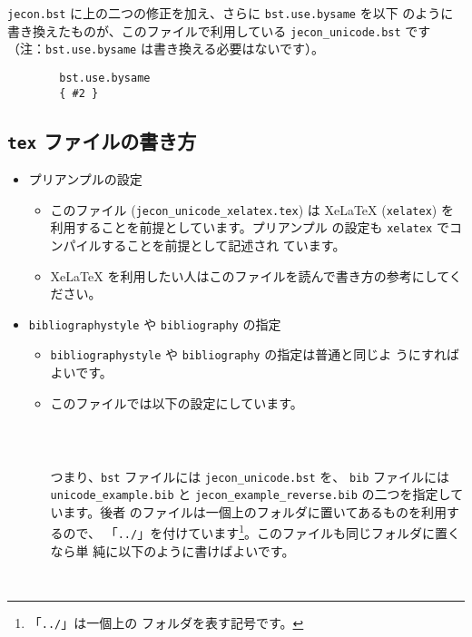 \documentclass[a4paper,10pt]{bxjsarticle}
\begin{document}
\texttt{jecon.bst} に上の二つの修正を加え、さらに \texttt{bst.use.bysame} を以下
のように書き換えたものが、このファイルで利用している \texttt{jecon\_unicode.bst}
です（注：\texttt{bst.use.bysame} は書き換える必要はないです）。
\begin{verbatim}
        bst.use.bysame
        { #2 }
\end{verbatim}

\subsection{\texttt{tex} ファイルの書き方}

\begin{itemize}
 \item プリアンプルの設定
       \begin{itemize}
        \item このファイル (\texttt{jecon\_unicode\_xelatex.tex}) は XeLaTeX
              (\texttt{xelatex}) を利用することを前提としています。プリアンプル
              の設定も \texttt{xelatex} でコンパイルすることを前提として記述され
              ています。
        \item XeLaTeX を利用したい人はこのファイルを読んで書き方の参考にしてく
              ださい。
       \end{itemize}
 \item \texttt{bibliographystyle} や \texttt{bibliography} の指定
       \begin{itemize}
        \item \texttt{bibliographystyle} や \texttt{bibliography} の指定は普通と同じよ
       うにすればよいです。
        \item このファイルでは以下の設定にしています。
\begin{verbatim}
           
            
\end{verbatim}
       つまり、\texttt{bst} ファイルには \texttt{jecon\_unicode.bst} を、
              \texttt{bib} ファイルには \texttt{unicode\_example.bib} と
              \texttt{jecon\_example\_reverse.bib} の二つを指定しています。後者
              のファイルは一個上のフォルダに置いてあるものを利用するので、
              「\texttt{../}」を付けています\footnote{「\texttt{../}」は一個上の
              フォルダを表す記号です。}。このファイルも同じフォルダに置くなら単
              純に以下のように書けばよいです。
\begin{verbatim}
            
\end{verbatim}
       \end{itemize}
\end{itemize}
\end{document}
